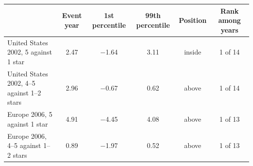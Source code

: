 \begin{tabular}{lccccc}
\toprule
 & Event year & 1st percentile & 99th percentile & Position & Rank among years \\
\midrule
United States 2002, 5 against 1 star & 2.47 & $-$1.64 & 3.11 & inside & 1 of 14 \\
United States 2002, 4--5 against 1--2 stars & 2.96 & $-$0.67 & 0.62 & above & 1 of 14 \\
Europe 2006, 5 against 1 star & 4.91 & $-$4.45 & 4.08 & above & 1 of 13 \\
Europe 2006, 4--5 against 1--2 stars & 0.89 & $-$1.97 & 0.52 & above & 1 of 13 \\
\bottomrule
\end{tabular}
